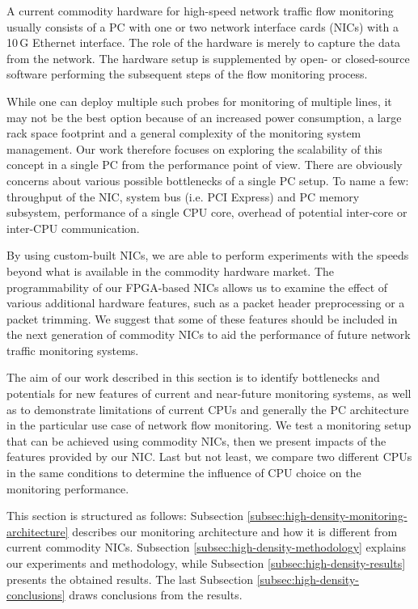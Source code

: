 A current commodity hardware for high-speed network traffic flow monitoring usually consists of a PC with one or two network interface cards (NICs) with a 10\,G Ethernet interface. The role of the hardware is merely to capture the data from the network. The hardware setup is supplemented by open- or closed-source software performing the subsequent steps of the flow monitoring process.

While one can deploy multiple such probes for monitoring of multiple lines, it may not be the best option because of an increased power consumption, a large rack space footprint and a general complexity of the monitoring system management. Our work therefore focuses on exploring the scalability of this concept in a single PC from the performance point of view. There are obviously concerns about various possible bottlenecks of a single PC setup. To name a few: throughput of the NIC, system bus (i.e. PCI Express) and PC memory subsystem, performance of a single CPU core, overhead of potential inter-core or inter-CPU communication.

By using custom-built NICs, we are able to perform experiments with the speeds beyond what is available in the commodity hardware market. The programmability of our FPGA-based NICs allows us to examine the effect of various additional hardware features, such as a packet header preprocessing or a packet trimming. We suggest that some of these features should be included in the next generation of commodity NICs to aid the performance of future network traffic monitoring systems.

The aim of our work described in this section is to identify bottlenecks and potentials for new features of current and near-future monitoring systems, as well as to demonstrate limitations of current CPUs and generally the PC architecture in the particular use case of network flow monitoring. We test a monitoring setup that can be achieved using commodity NICs, then we present impacts of the features provided by our NIC. Last but not least, we compare two different CPUs in the same conditions to determine the influence of CPU choice on the monitoring performance.

This section is structured as follows: Subsection \ref{subsec:high-density-monitoring-architecture} describes our monitoring architecture and how it is different from current commodity NICs. Subsection \ref{subsec:high-density-methodology} explains our experiments and methodology, while Subsection \ref{subsec:high-density-results} presents the obtained results. The last Subsection \ref{subsec:high-density-conclusions} draws conclusions from the results.

